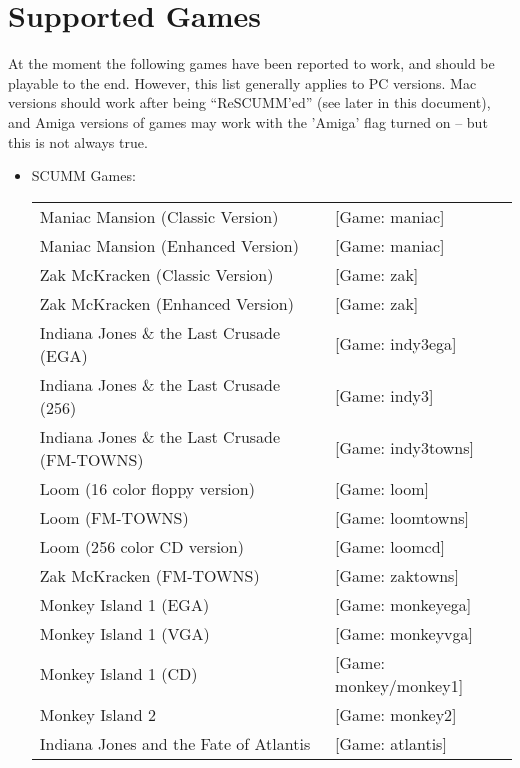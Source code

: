 


\section{Supported Games}

At the moment the following games have been reported to work, and should
be playable to the end. However, this list generally applies to PC versions.
Mac versions should work after being ``ReSCUMM'ed'' (see later in this document),
and Amiga versions of games may work with the 'Amiga' flag turned on -- but
this is not always true.

\begin{itemize}
\item SCUMM Games:\\
  \begin {tabular} [h] {ll}
    Maniac Mansion (Classic Version)&              [Game: maniac]\\
    Maniac Mansion (Enhanced Version)&             [Game: maniac]\\
    Zak McKracken (Classic Version)&               [Game: zak]\\
    Zak McKracken (Enhanced Version)&              [Game: zak]\\
    Indiana Jones \& the Last Crusade (EGA)&       [Game: indy3ega]\\
    Indiana Jones \& the Last Crusade (256)&       [Game: indy3]\\
    Indiana Jones \& the Last Crusade (FM-TOWNS)&  [Game: indy3towns]\\
    Loom (16 color floppy version)&                [Game: loom]\\
    Loom (FM-TOWNS)&                               [Game: loomtowns]\\
    Loom (256 color CD version)&                   [Game: loomcd]\\
    Zak McKracken (FM-TOWNS)&                      [Game: zaktowns]\\
    Monkey Island 1 (EGA)&                         [Game: monkeyega]\\
    Monkey Island 1 (VGA)&                         [Game: monkeyvga]\\
    Monkey Island 1 (CD)&                          [Game: monkey/monkey1]\\
    Monkey Island 2&                               [Game: monkey2]\\
    Indiana Jones and the Fate of Atlantis&        [Game: atlantis]\\

\end{tabular}
\end{itemize}
